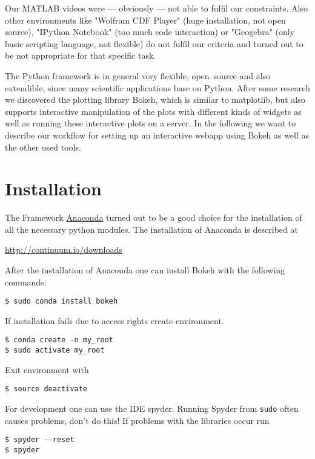 \documentclass[a4paper,pdftex]{scrartcl}
\begin{document}
Our MATLAB videos were --- obviously --- not able to fulfil our constraints. Also other environments like "Wolfram CDF Player" (huge installation, not open source), "IPython Notebook" (too much code interaction) or "Geogebra" (only basic scripting language, not flexible) do not fulfil our criteria and turned out to be not appropriate for that specific task.

The Python framework is in general very flexible, open--source and also extendible, since many scientific applications base on Python. After some research we discovered the plotting library Bokeh, which is similar to matplotlib, but also supports interactive manipulation of the plots with different kinds of widgets as well as running these interactive plots on a server. In the following we want to describe our workflow for setting up an interactive webapp using Bokeh as well as the other used tools. 

\section{Installation}
The Framework \href{http://continuum.io/downloads}{Anaconda} turned out to be a good choice for the installation of all the necessary python modules. The installation of Anaconda is described at
\begin{center}
\href{http://continuum.io/downloads}{http://continuum.io/downloads}
\end{center}

After the installation of Anaconda one can install Bokeh with the following commands:
\begin{verbatim}
$ sudo conda install bokeh
\end{verbatim}
If installation fails due to access rights create environment.
\begin{verbatim}
$ conda create -n my_root
$ sudo activate my_root
\end{verbatim}
Exit environment with
\begin{verbatim}
$ source deactivate
\end{verbatim}
For development one can use the IDE spyder. Running Spyder from \verb!sudo! often causes problems, don't do this! If problems with the libraries occur run
\begin{verbatim}
$ spyder --reset
$ spyder
\end{verbatim}
\end{document}
